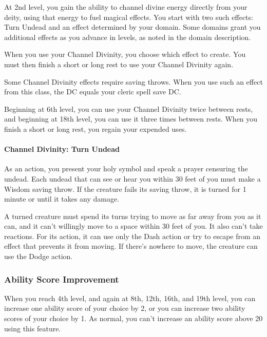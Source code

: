 \documentclass[
]{article}
\begin{document}
At 2nd level, you gain the ability to channel divine energy directly
from your deity, using that energy to fuel magical effects. You start
with two such effects: Turn Undead and an effect determined by your
domain. Some domains grant you additional effects as you advance in
levels, as noted in the domain description.

When you use your Channel Divinity, you choose which effect to create.
You must then finish a short or long rest to use your Channel Divinity
again.

Some Channel Divinity effects require saving throws. When you use such
an effect from this class, the DC equals your cleric spell save DC.

Beginning at 6th level, you can use your Channel Divinity twice between
rests, and beginning at 18th level, you can use it three times between
rests. When you finish a short or long rest, you regain your expended
uses.

\hypertarget{channel-divinity-turn-undead}{%
\paragraph{Channel Divinity: Turn
Undead}\label{channel-divinity-turn-undead}}

As an action, you present your holy symbol and speak a prayer censuring
the undead. Each undead that can see or hear you within 30 feet of you
must make a Wisdom saving throw. If the creature fails its saving throw,
it is turned for 1 minute or until it takes any damage.

A turned creature must spend its turns trying to move as far away from
you as it can, and it can't willingly move to a space within 30 feet of
you. It also can't take reactions. For its action, it can use only the
Dash action or try to escape from an effect that prevents it from
moving. If there's nowhere to move, the creature can use the Dodge
action.

\hypertarget{ability-score-improvement}{%
\subsubsection{Ability Score
Improvement}\label{ability-score-improvement}}

When you reach 4th level, and again at 8th, 12th, 16th, and 19th level,
you can increase one ability score of your choice by 2, or you can
increase two ability scores of your choice by 1. As normal, you can't
increase an ability score above 20 using this feature.
\end{document}
